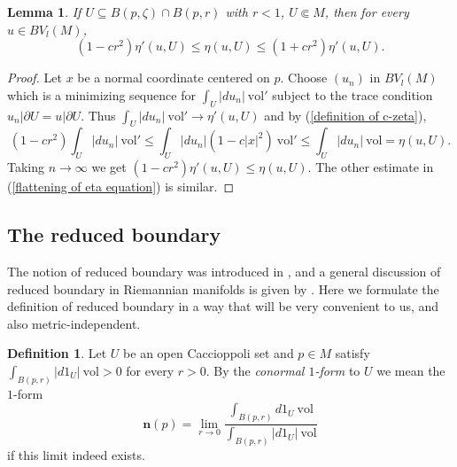 \documentclass[reqno,12pt,letterpaper]{amsart}
\newcommand{\normal}{\mathbf n}
\newcommand{\vol}{\mathrm{vol}}
\newcommand{\dfn}[1]{\emph{#1}\index{#1}}
\newtheorem{lemma}[theorem]{Lemma}
\theoremstyle{definition}
\newtheorem{definition}[theorem]{Definition}
\numberwithin{equation}{section}
\begin{document}
\begin{lemma}\label{flattening of eta}
If $U \subseteq B(p, \zeta) \cap B(p, r)$ with $r < 1$, $U \Subset M$, then for every $u \in BV_l(M)$,
\begin{equation}\label{flattening of eta equation}
(1 - cr^2) \eta'(u, U) \leq \eta(u, U) \leq (1 + cr^2) \eta'(u, U).
\end{equation}
\end{lemma}
\begin{proof}
Let $x$ be a normal coordinate centered on $p$.
Choose $(u_n)$ in $BV_l(M)$ which is a minimizing sequence for $\int_U |du_n| ~\vol'$ subject to the trace condition $u_n|\partial U = u|\partial U$.
Thus $\int_U |du_n| ~\vol' \to \eta'(u, U)$ and by (\ref{definition of c-zeta}),
$$(1 - cr^2) \int_U |du_n| ~\vol' \leq \int_U |du_n| (1 - c|x|^2) ~\vol' \leq \int_U |du_n| ~\vol = \eta(u, U).$$
Taking $n \to \infty$ we get $(1 - cr^2) \eta'(u, U) \leq \eta(u, U)$.
The other estimate in (\ref{flattening of eta equation}) is similar.
\end{proof}


\subsection{The reduced boundary}\label{reduced boundary}
The notion of reduced boundary was introduced in \cite{deGiorgi55}, and a general discussion of reduced boundary in Riemannian manifolds is given by \cite{Battista_2021}.
Here we formulate the definition of reduced boundary in a way that will be very convenient to us, and also metric-independent.

\begin{definition}
Let $U$ be an open Caccioppoli set and $p \in M$ satisfy $\int_{B(p, r)} |d1_U| ~\vol > 0$ for every $r > 0$.
By the \dfn{conormal $1$-form} to $U$ we mean the $1$-form
$$\normal(p) = \lim_{r \to 0} \frac{\int_{B(p, r)} d1_U ~\vol}{\int_{B(p, r)} |d1_U| ~\vol}$$
if this limit indeed exists.
\end{definition}
\end{document}
